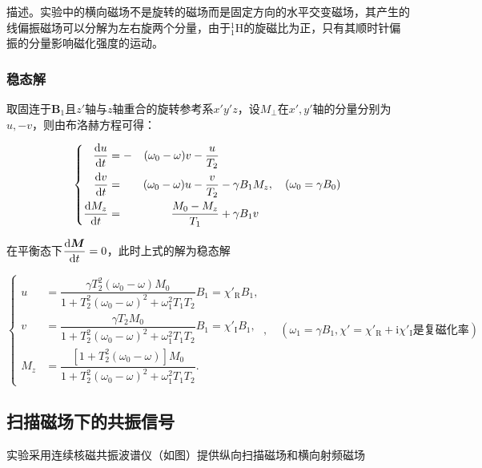 描述。实验中的横向磁场不是旋转的磁场而是固定方向的水平交变磁场，其产生的线偏振磁场可以分解为左右旋两个分量，由于\(^1_1\mathrm{H}\)的旋磁比为正，只有其顺时针偏振的分量影响磁化强度的运动。

\subsubsection{稳态解}\label{ux7a33ux6001ux89e3}

取固连于\(\boldsymbol{B}_1\)且\(z'\)轴与\(z\)轴重合的旋转参考系\(x'y'z\)，设\(M_{\perp}\)在\(x',y'\)轴的分量分别为\(u,-v\)，则由布洛赫方程可得：

\begin{equation}
  \left\{
  \begin{aligned}
    \dfrac{{\rm d}u}{{\rm d}t} & = - & (\omega_0 - \omega)v-\dfrac{u}{T_2} &\\
    \dfrac{{\rm d}v}{{\rm d}t} & = & (\omega_0 - \omega)u-\dfrac{v}{T_2} & - \gamma B_1M_z\\
    \dfrac{{\rm d}M_z}{{\rm d}t} & = & \dfrac{M_0-M_z}{T_1} & + \gamma B_1 v
  \end{aligned}
  ,\quad (\omega_0 = \gamma B_0)\right.
\end{equation}

在平衡态下\(\dfrac{{\rm d}\boldsymbol{M}}{{\rm d}t}=0\)，此时上式的解为稳态解

\begin{equation}
  \left\{
  \begin{aligned}
      u & = \dfrac{\gamma T_2^2(\omega_0-\omega)M_0}{1+T_2^2(\omega_0-\omega)^2+\omega_1^2T_1T_2}B_1 = \chi'_{\mathrm{R}} B_1,\\
      v & = \dfrac{\gamma T_2M_0}{1+T_2^2(\omega_0-\omega)^2+\omega_1^2T_1T_2}B_1 = \chi'_{\mathrm{I}} B_1,\\
      M_z & = \dfrac{[1+T_2^2(\omega_0-\omega)]M_0}{1+T_2^2(\omega_0-\omega)^2+\omega_1^2T_1T_2}.
  \end{aligned}
  ,\quad (\omega_1 = \gamma B_1, \chi' = \chi'_{\mathrm{R}}+\mathrm{i}\chi'_{\mathrm{I}}\text{是复磁化率})\right.\label{eq:aksdjlfadsjkl}
\end{equation}

\subsection{扫描磁场下的共振信号}\label{ux8109ux51b2ux26c1ux573aux4e0bux7684ux5171ux632fux4fe1ux53f6}

实验采用连续核磁共振波谱仪（如图）提供纵向扫描磁场和横向射频磁场

